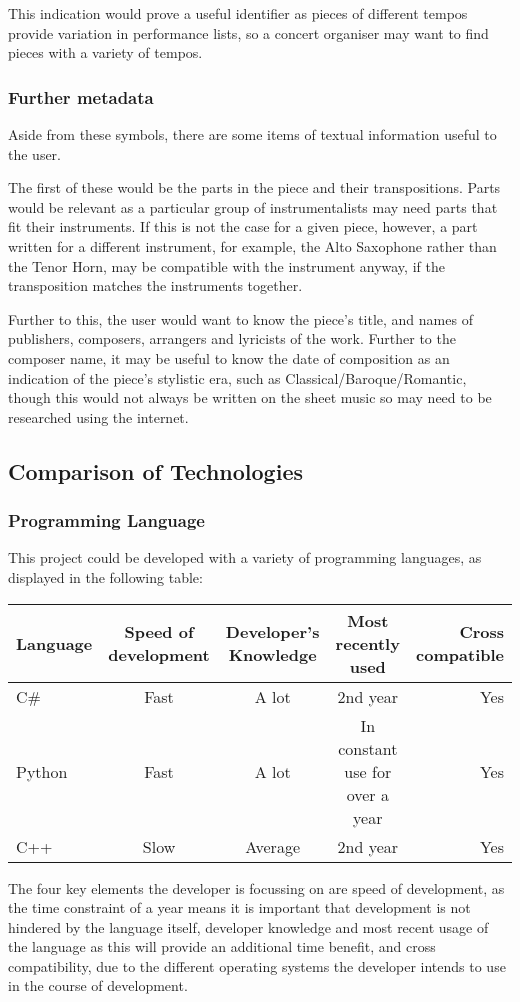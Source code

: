 This indication would prove a useful identifier as pieces of different tempos provide variation in performance lists, so a concert organiser may want to find pieces with a variety of tempos.

\subsubsection{Further metadata}
Aside from these symbols, there are some items of textual information useful to the user. 

The first of these would be the parts in the piece and their transpositions. Parts would be relevant as a particular group of instrumentalists may need parts that fit their instruments. If this is not the case for a given piece, however, a part written for a different instrument, for example, the Alto Saxophone rather than the Tenor Horn, may be compatible with the instrument anyway, if the transposition matches the instruments together.

Further to this, the user would want to know the piece's title, and names of publishers, composers, arrangers and lyricists of the work. Further to the composer name, it may be useful to know the date of composition as an indication of the piece's stylistic era, such as Classical/Baroque/Romantic, though this would not always be written on the sheet music so may need to be researched using the internet.


\subsection{Comparison of Technologies}
\subsubsection{Programming Language}
This project could be developed with a variety of programming languages, as displayed in the following table:

\begin{center}
\begin{tabular}{| l | c | c | c | r |} \hline
  {Language} & {Speed of development} & {Developer's Knowledge} & {Most recently used} & {Cross compatible} \\ \hline
  C\# & Fast & A lot & 2nd year & Yes \\ \hline
  Python & Fast & A lot & In constant use for over a year & Yes \\ \hline
  C++ & Slow & Average & 2nd year & Yes \\ \hline
\end{tabular}
\end{center}
The four key elements the developer is focussing on are speed of development, as the time constraint of a year means it is important that development is not hindered by the language itself, developer knowledge and most recent usage of the language as this will provide an additional time benefit, and cross compatibility, due to the different operating systems the developer intends to use in the course of development.

